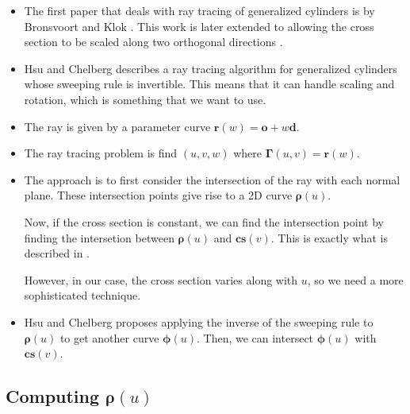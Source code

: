 \documentclass[10pt]{article}
\newcommand{\ve}[1]{\bm{#1}}
\begin{document}
\begin{itemize}
  \item The first paper that deals with ray tracing of generalized cylinders is by Bronsvoort and Klok \cite{Bronsvoort:1985}. This work is later extended to allowing the cross section to be scaled along two orthogonal directions \cite{Bronsvoort:1989}.
  
  \item Hsu and Chelberg \cite{hsu:1994} describes a ray tracing algorithm for generalized cylinders whose sweeping rule is invertible. This means that it can handle scaling and rotation, which is something that we want to use.
  
  \item The ray is given by a parameter curve $\ve{r}(w) = \ve{o} + w\ve{d}.$
  
  \item The ray tracing problem is find $(u,v,w)$ where $\ve{\Gamma}(u,v) = \ve{r}(w).$
  
  \item The approach is to first consider the intersection of the ray with each normal plane. These intersection points give rise to a 2D curve $\ve{\rho}(u)$.
  
  Now, if the cross section is constant, we can find the intersection point by finding the intersetion between $\ve{\rho}(u)$ and $\ve{cs}(v)$. This is exactly what is described in \cite{Bronsvoort:1985}.
  
  However, in our case, the cross section varies along with $u$, so we need a more sophisticated technique.
  
  \item Hsu and Chelberg proposes applying the inverse of the sweeping rule to $\ve{\rho}(u)$ to get another curve $\ve{\phi}(u)$. Then, we can intersect $\ve{\phi}(u)$ with $\ve{cs}(v)$.
  
\end{itemize}

\subsection{Computing $\ve{\rho}(u)$}
\end{document}
